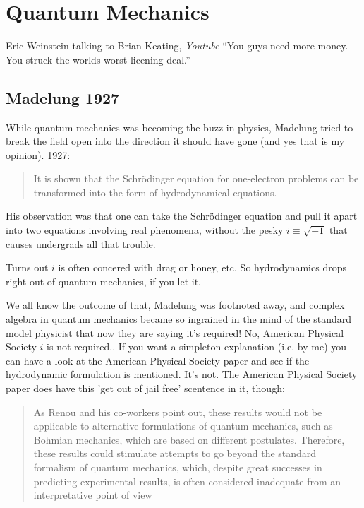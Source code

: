 \documentclass[../rzero]{subfiles}
\begin{document}
\chapter{Quantum Mechanics}\label{quantumMechanicsChapter}

\begin{chapquote}{Eric Weinstein talking to Brian Keating, \textit{Youtube\cite{drbriankeatingEricWeinsteinTheoretical2020}}}
``You guys need more money. You struck the worlds worst licening deal.''
\end{chapquote}

\section{Madelung 1927}
While quantum mechanics was becoming the buzz in physics, Madelung\cite{E.Madelung1927} tried to break the field open into the direction it should have gone (and yes that is my opinion). 1927:
\begin{quotation}
	It is shown that the Schrödinger equation for one-electron problems can be transformed into the form of hydrodynamical equations.
\end{quotation}

His observation was that one can take the Schrödinger equation and pull it apart into two equations involving real phenomena, without the pesky $i \equiv \sqrt{-1}$ that causes undergrads all that trouble. 

Turns out $i$ is often concered with drag or honey, etc. So hydrodynamics drops right out of quantum mechanics, if you let it.  

We all know the outcome of that, Madelung was footnoted away, and complex algebra in quantum mechanics became so ingrained in the mind of the standard model physicist that now they are saying it's required!\cite{avellaQuantumMechanicsMust2022} No, American Physical Society $i$ is not required.\cite{mckagueSimulatingQuantumSystems2008}. If you want a simpleton explanation (i.e. by me) you can have a look at the American Physical Society paper and see if the hydrodynamic formulation is mentioned. It's not. The American Physical Society paper does have this 'get out of jail free' scentence in it, though: 

\begin{quotation}
	As Renou and his co-workers point out, these results would not be applicable to alternative formulations of quantum mechanics, such as Bohmian mechanics, which are based on different postulates. Therefore, these results could stimulate attempts to go beyond the standard formalism of quantum mechanics, which, despite great successes in predicting experimental results, is often considered inadequate from an interpretative point of view
\end{quotation} 
\end{document}
